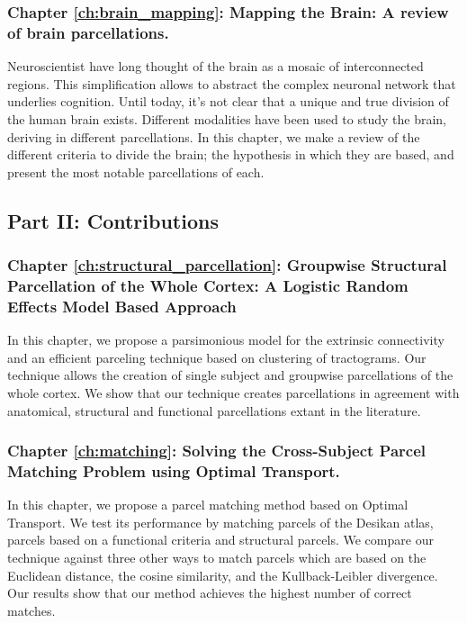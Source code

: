 \subsubsection{Chapter \ref{ch:brain_mapping}: Mapping the Brain: A review of brain parcellations.}
Neuroscientist have long thought of the brain as a mosaic of interconnected
regions. This simplification allows to abstract the complex neuronal network
that underlies cognition. Until today, it's not clear that a unique and true
division of the human brain exists. Different modalities have been used to
study the brain, deriving in different parcellations. In this chapter, we make
a review of the different criteria to divide the brain; the hypothesis in
which they are based, and present the most notable parcellations of each.

\subsection{Part II: Contributions}

\subsubsection{Chapter \ref{ch:structural_parcellation}: Groupwise Structural Parcellation of the Whole Cortex: A Logistic Random Effects Model Based Approach}
In this chapter, we propose a parsimonious model for the extrinsic connectivity
and an efficient parceling technique based on clustering of tractograms. 
Our technique allows the creation of single subject and groupwise parcellations
of the whole cortex. We show that our technique creates parcellations in
agreement with anatomical, structural and functional parcellations extant in 
the literature.

\subsubsection{Chapter \ref{ch:matching}: Solving the Cross-Subject Parcel Matching Problem using Optimal Transport.}
In this chapter, we propose a parcel matching method based on Optimal Transport.
We test its performance by matching parcels of the Desikan atlas, parcels based
on a functional criteria and structural parcels. We compare our technique against
three other ways to match parcels which are based on the Euclidean distance, the
cosine similarity, and the Kullback-Leibler divergence. Our results show that
our method achieves the highest number of correct matches.

